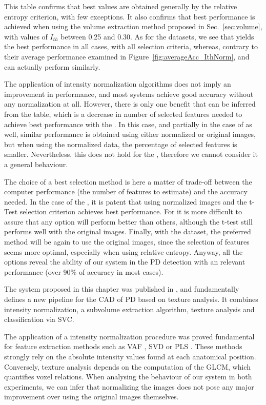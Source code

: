 This table confirms that best values are obtained generally by the relative entropy criterion, with few exceptions. It also confirms that best performance is achieved when using the volume extraction method proposed in Sec.~\ref{sec:volume}, with values of $I_{th}$ between 0.25 and 0.30. As for the datasets, we see that \ppmidat{} yields the best performance in all cases, with all selection criteria, whereas, contrary to their average performance examined in Figure~\ref{fig:averageAcc_IthNorm}, \vdlndat{}{} and \vdlvdat{} can actually perform similarly. 

The application of intensity normalization algorithms does not imply an improvement in performance, and most systems achieve good accuracy without any normalization at all. However, there is only one benefit that can be inferred from the table, which is a decrease in number of selected features needed to achieve best performance with the \ppmidat{}. In this case, and partially in the case of \vdlvdat{} as well, similar performance is obtained using either normalized or original images, but when using the normalized data, the percentage of selected features is smaller. Nevertheless, this does not hold for the \vdlndat{}, therefore we cannot consider it a general behaviour. 

The choice of a best selection method is here a matter of trade-off between the computer performance (the number of features to estimate) and the accuracy needed. In the case of the \ppmidat{}, it is patent that using normalized images and the t-Test selection criterion achieves best performance. For \vdlndat{} it is more difficult to assure that any option will perform better than others, although the t-test still performs well with the original images. Finally, with the \vdlvdat{} dataset, the preferred method will be again to use the original images, since the selection of features seems more optimal, especially when using relative entropy. Anyway, all the options reveal the ability of our system in the PD detection with an relevant performance (over 90\% of accuracy in most cases). 

\label{sec:ch5discuss}
The system proposed in this chapter was published in \cite{Martinez-Murcia2013266,martinez2014parametrization}, and fundamentally defines a new pipeline for the \ac{CAD} of \ac{PD} based on texture analysis. It combines intensity normalization, a subvolume extraction algorithm, texture analysis and classification via \ac{SVC}. 

The application of a intensity normalization procedure was proved fundamental for feature extraction methods such as \ac{VAF} \cite{Illan2012}, \ac{SVD} \cite{Segovia2012} or \ac{PLS} \cite{Rojas2012}. These methods strongly rely on the absolute intensity values found at each anatomical position. Conversely, texture analysis depends on the computation of the \ac{GLCM}, which quantifies voxel relations. When analysing the behaviour of our system in both experiments, we can infer that normalizing the images does not pose any major improvement over using the original images themselves. 

